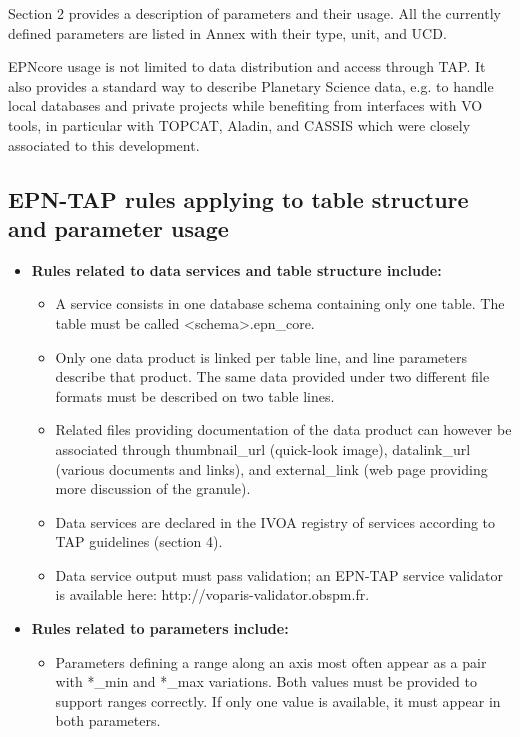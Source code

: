 \documentclass[11pt,a4paper]{ivoa}
\begin{document}
Section 2 provides a description of parameters and their usage. All the currently defined parameters are listed in Annex with their type, unit, and UCD. 

EPNcore usage is not limited to data distribution and access through TAP. It also provides a standard way to describe Planetary Science data, e.g. to handle local databases and private projects while benefiting from interfaces with VO tools, in particular with TOPCAT, Aladin, and CASSIS which were closely associated to this development. 

\subsection{EPN-TAP rules applying to table structure and parameter usage}


\begin{itemize}
\item \textbf{Rules related to data services and table structure include:}

\begin{itemize}
\item 
A service consists in one database schema containing only one table. The table must be called <schema>.epn\_core. 

\item Only one data product is linked per table line, and line parameters describe that product. The same data provided under two different file formats must be described on two table lines.

\item Related files providing documentation of the data product can however be associated through thumbnail\_{url} (quick-look image), datalink\_url (various documents and links), and external\_link (web page providing more discussion of the granule).

\item Data services are declared in the IVOA registry of services according to TAP guidelines (section 4).

\item Data service output must pass validation; an EPN-TAP service validator is available here: http://voparis-validator.obspm.fr.
\end{itemize}


\item \textbf{Rules related to parameters include:}

\begin{itemize}
\item Parameters defining a range along an axis most often appear as a pair with *\_min and *\_max variations.
Both values must be provided to support ranges correctly. If only one value is available, it must appear in both parameters.



\end{itemize}
\end{itemize}
\end{document}
